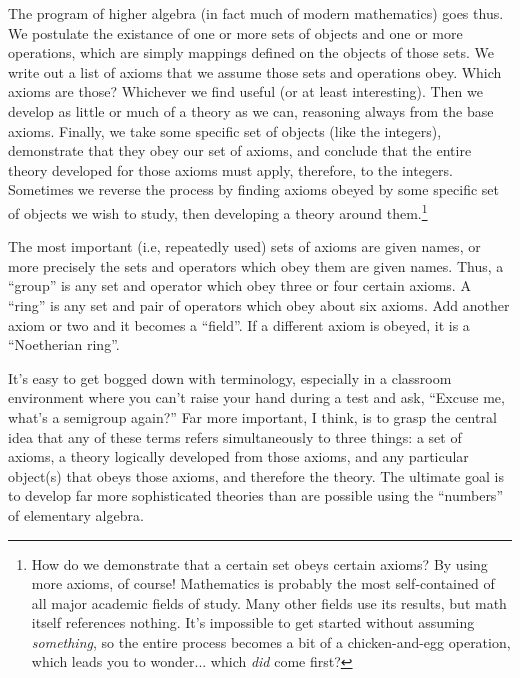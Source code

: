The program of higher algebra (in fact much of modern mathematics)
goes thus.  We postulate the existance of one or more sets of objects
and one or more operations, which are simply mappings defined on the
objects of those sets.  We write out a list of axioms that we assume
those sets and operations obey.  Which axioms are those?  Whichever we
find useful (or at least interesting).  Then we develop as little or
much of a theory as we can, reasoning always from the base axioms.
Finally, we take some specific set of objects (like the integers),
demonstrate that they obey our set of axioms, and conclude that the
entire theory developed for those axioms must apply, therefore, to the
integers.  Sometimes we reverse the process by finding axioms obeyed
by some specific set of objects we wish to study, then developing a
theory around them.\footnote{How do we demonstrate that a certain set
obeys certain axioms?  By using more axioms, of course!  Mathematics
is probably the most self-contained of all major academic fields of study.
Many other fields use its results, but math itself references nothing.
It's impossible to get started without assuming {\it something}, so
the entire process becomes a bit of a chicken-and-egg operation, which
leads you to wonder$...$ which {\it did} come first?}

The most important (i.e, repeatedly used) sets of axioms are given
names, or more precisely the sets and operators which obey them are
given names.  Thus, a ``group'' is any set and operator which obey three
or four certain axioms.  A ``ring'' is any set and pair of operators
which obey about six axioms.  Add another axiom or two and it
becomes a ``field''.  If a different axiom is obeyed, it is a
``Noetherian ring''.

It's easy to get bogged down with terminology, especially in a
classroom environment where you can't raise your hand during a test
and ask, ``Excuse me, what's a semigroup again?''  Far more important,
I think, is to grasp the central idea that any of these terms refers
simultaneously to three things: a set of axioms, a theory logically
developed from those axioms, and any particular object(s) that obeys
those axioms, and therefore the theory.  The ultimate goal is to
develop far more sophisticated theories than are possible using the
``numbers'' of elementary algebra.


